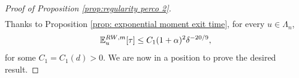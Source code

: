 \documentclass[10pt,a4paper]{amsart}
\begin{document}
\begin{proof}[Proof of Proposition \textup{\ref{prop:regularity perco 2}}]
\begin{multline}
\end{multline}
Thanks to Proposition \ref{prop: exponential moment exit time}, for every $u\in \Lambda_n$,
\begin{equation}\label{eq:proof propreg2 2}
	\mathbb E_u^{{\rm RW},m}[\tau]\leq C_1(1+\alpha)^2\delta^{-20/9},
\end{equation}
for some $C_1=C_1(d)>0$.
%
We are now in a position to prove the desired result.


\end{proof}
\end{document}
